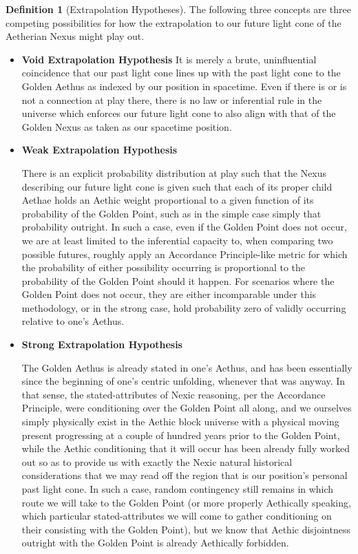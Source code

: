 \documentclass[11pt]{article}
\numberwithin{equation}{section}
\theoremstyle{plain}
\theoremstyle{definition}
\newtheorem{definition}[theorem]{Definition}
\theoremstyle{remark}
\begin{document}
\begin{definition}[Extrapolation Hypotheses]
    The following three concepts are three competing possibilities for how the extrapolation to our future light cone of the Aetherian Nexus might play out. 
    \begin{itemize}
    \item \textbf{Void Extrapolation Hypothesis}
    It is merely a brute, uninfluential coincidence that our past light cone lines up with the past light cone to the Golden Aethus as indexed by our position in spacetime. Even if there is or is not a connection at play there, there is no law or inferential rule in the universe which enforces our future light cone to also align with that of the Golden Nexus as taken as our spacetime position. 

    \item \textbf{Weak Extrapolation Hypothesis}

    There is an explicit probability distribution at play such that the Nexus describing our future light cone is given such that each of its proper child Aethae holds an Aethic weight proportional to a given function of its probability of the Golden Point, such as in the simple case simply that probability outright. In such a case, even if the Golden Point does not occur, we are at least limited to the inferential capacity to, when comparing two possible futures, roughly apply an Accordance Principle-like metric for which the probability of either possibility occurring is proportional to the probability of the Golden Point should it happen. For scenarios where the Golden Point does not occur, they are either incomparable under this methodology, or in the strong case, hold probability zero of validly occurring relative to one's Aethus. 

    \item \textbf{Strong Extrapolation Hypothesis}

    The Golden Aethus is already stated in one's Aethus, and has been essentially since the beginning of one's centric unfolding, whenever that was anyway. In that sense, the stated-attributes of Nexic reasoning, per the Accordance Principle, were conditioning over the Golden Point all along, and we ourselves simply physically exist in the Aethic block universe with a physical moving present progressing at a couple of hundred years prior to the Golden Point, while the Aethic conditioning that it will occur has been already fully worked out so as to provide us with exactly the Nexic natural historical considerations that we may read off the region that is our position's personal past light cone. In such a case, random contingency still remains in which route we will take to the Golden Point (or more properly Aethically speaking, which particular stated-attributes we will come to gather conditioning on their consisting with the Golden Point), but we know that Aethic disjointness outright with the Golden Point is already Aethically forbidden.


\end{itemize}
\end{definition}
\end{document}
